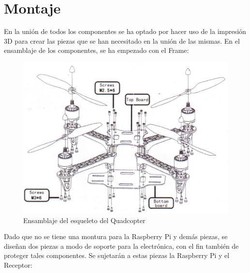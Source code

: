\documentclass[twoside,11pt]{book}
\begin{document}
\newpage
\section{Montaje}

En la unión de todos los componentes se ha optado por hacer uso de la impresión 3D para crear las piezas que se han necesitado en la unión de las mismas. En el ensamblaje de los componentes, se ha empezado con el Frame: \\


\begin{figure}[h!]
\begin{center}
\includegraphics[scale=0.3,bb=0 0 1100 750]{images/frame_mount.png}
\end{center}
\caption{Ensamblaje del esqueleto del Quadcopter}
\end{figure}

Dado que no se tiene una montura para la Raspberry Pi y demás piezas, se diseñan dos piezas a modo de soporte para la electrónica, con el fin también de proteger tales componentes. Se sujetarán a estas piezas la Raspberry Pi y el Receptor: \\
\end{document}
